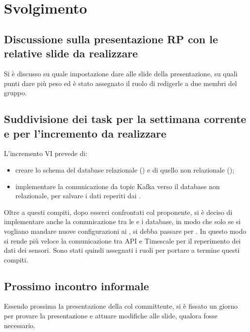 \newpage
\section*{Svolgimento}

	\subsection*{Discussione sulla presentazione RP con le relative slide da realizzare}
		Si è discusso su quale impostazione dare alle slide della presentazione, su quali punti dare più peso ed è stato assegnato il ruolo di redigerle a due membri del gruppo. 

	\subsection*{Suddivisione dei task per la settimana corrente e per l'incremento da realizzare}
		L'incremento VI prevede di:
		\begin{itemize}
			\item creare lo schema del database relazionale () e di quello non relazionale ();
			\item implementare la comunicazione da topic Kafka verso il database non relazionale, per salvare i dati reperiti dai .
		\end{itemize}
		Oltre a questi compiti, dopo esserci confrontati col proponente, si è deciso di implementare anche la comunicazione tra le  e i database, in modo che solo se si vogliano mandare nuove configurazioni ai  , si debba passare per . In questo modo si rende più veloce la comunicazione tra API e Timescale per il reperimento dei dati dei sensori.
		\newline
		Sono stati quindi assegnati i ruoli per portare a termine questi compiti.

	\subsection*{Prossimo incontro informale}
		Essendo prossima la presentazione della  col committente, si è fissato un giorno per provare la presentazione e attuare modifiche alle slide, qualora fosse necessario.
